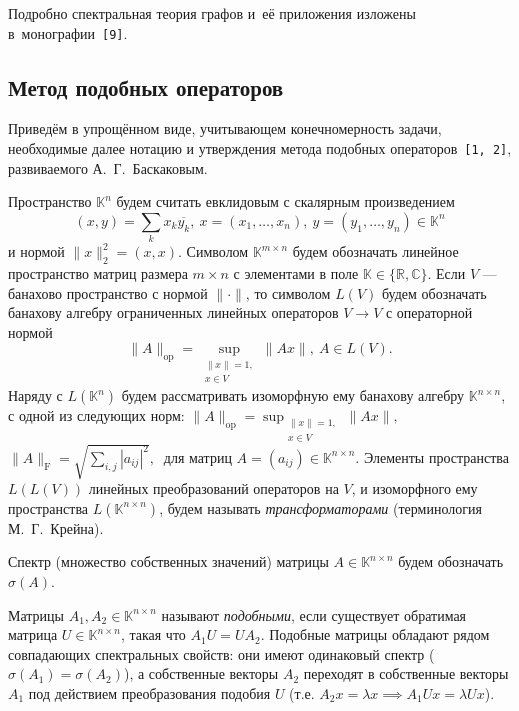 \documentclass[12pt]{article}
\theoremstyle{definition}
\begin{document}
Подробно спектральная теория графов и~е\"е приложения
    изложены в~монографии~\texttt{[9]}.
\subsection*{Метод подобных операторов}
Приведём в упрощённом виде, учитывающем конечномерность задачи,
    необходимые далее нотацию и утверждения
    метода подобных операторов~\texttt{[1, 2]},
    развиваемого А.~Г.~Баскаковым.


Пространство \( \mathbb{K}^n \)
    будем считать евклидовым с скалярным произведением
    \[
        (x, y){=}\sum_k x_k\overline{y_k},
        \ x{=}(x_1,\ldots, x_n),
        \ y=(y_1,\ldots, y_n)
        \in \mathbb{K}^n
        \]
    и нормой
    \(
        \|x\|_2^2{=}(x,x).
        \)
Символом \( \mathbb{K}^{m\times n} \)
    будем обозначать линейное пространство
    матриц размера \( m{\times}n \)
    с элементами в поле \( \mathbb{K}\in\{\mathbb{R},\mathbb{C}\} \).
Если \( V \) --- банахово пространство с нормой \( \|\cdot\| \),
    то символом \( L(V) \)
    будем обозначать банахову алгебру
    ограниченных линейных операторов \( V\to V \)
    с операторной нормой
\[
    \|A\|_{\mathrm{op}} = \sup_{\substack{\|x\|=1,\\ x\in V}} \|A x\|,\ A\in L(V).
    \]
Наряду с \( L(\mathbb{K}^n) \)
    будем рассматривать изоморфную ему
    банахову алгебру \( \mathbb{K}^{n\times n} \),
    с одной из следующих норм:
    \( \|A\|_{\mathrm{op}} = \sup_{\substack{\|x\|=1,\\ x\in V}} \|A x\|,\ \)
    \( \|A\|_{\mathrm{F}} = \sqrt{\sum_{i,j} |a_{ij}|^2},\ \)
    для матриц \( A{=}(a_{ij})\in\mathbb{K}^{n\times n} \).
Элементы пространства
    \( L(L(V)) \)
    линейных преобразований операторов на \( V \),
    и изоморфного ему пространства \( L(\mathbb{K}^{n\times n}) \),
    будем называть \emph{трансформаторами}
    (терминология М.~Г.~Крейна).

Спектр (множество собственных значений)
    матрицы \( A\in\mathbb{K}^{n\times n} \)
    будем обозначать \( \sigma(A) \).

Матрицы \( A_1, A_2 \in \mathbb{K}^{n\times n} \)
    называют \emph{подобными}, если существует
    обратимая матрица \( U\in\mathbb{K}^{n\times n} \),
    такая что \( A_1 U = U A_2 \).
Подобные матрицы обладают рядом совпадающих спектральных свойств:
    они имеют одинаковый спектр (\( \sigma(A_1)=\sigma(A_2) \)),
    а собственные векторы \( A_2 \) переходят
    в собственные векторы \( A_1 \) под действием
    преобразования подобия \( U \)
    (т.е. \( A_2 x = \lambda x \implies A_1 U x = \lambda U x \)).
\end{document}

